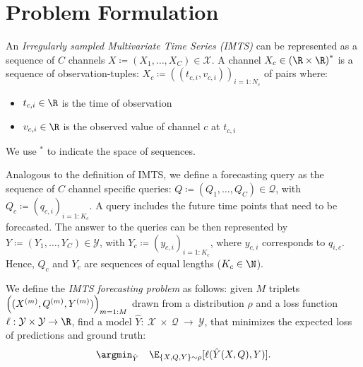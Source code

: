 \section{Problem Formulation}
%
\begin{definition}[IMTS]
An \emph{Irregularly sampled Multivariate Time Series (IMTS)} can be represented as a sequence of $C$ channels $X \coloneqq (X_1, \ldots, X_C) \in \mathcal{X}$. 
A channel $X_c \in {(\R \times \R)}^*$ is a sequence of observation-tuples:  $X_c \coloneqq {((t_{c,i},v_{c,i}))}_{i=1:N_c}$ of pairs where: 
\begin{itemize}
    \item $t_{c,i} \in \R$ is the time of observation 
    \item $v_{c,i} \in \R $ is the observed value of channel $c$ at $t_{c,i}$
\end{itemize}

We use $^*$ to indicate the space of sequences.

  
\end{definition}

\begin{definition}[Query]
Analogous to the definition of IMTS, we define a forecasting query as the sequence of $C$ 
channel specific queries: $Q \coloneqq (Q_1, \ldots ,Q_C) \in \mathcal{Q}$, with $Q_c \coloneqq {(q_{c,i})}_{i=1:K_c}$.
A query includes the future time points that need to be forecasted.
The answer to the queries can be then represented by $Y \coloneqq (Y_1,\ldots,Y_C) \in \mathcal{Y}$, with $Y_c \coloneqq {(y_{c,i})}_{i=1:K_c}$, where $y_{c,i}$ corresponds to $q_{i,c}$.
Hence, $Q_c$ and $Y_c$ are sequences of equal lengths ($K_c \in \N$).  
\end{definition}

\begin{problem}
We define the \emph{IMTS forecasting problem} as follows:
given $M$ triplets ${\Bigl( (X^{(m)}, Q^{(m)}, Y^{(m)})\Bigr)}_{m=1:M}$ drawn from a distribution $\rho$
and a loss function $\ell: \mathcal{Y} \times \mathcal{Y} \to \R$, find a model 
$\hat{Y}:~\mathcal{X}~\times~\mathcal{Q}~\to~\mathcal{Y}$,
that minimizes the expected loss of predictions and ground truth:
\begin{align}
    \argmin_{\hat{Y}} \quad \E_{\{X,Q, Y\} \sim \rho } [\ell(\hat{Y}(X,Q), Y)].
\end{align} 
\end{problem}

